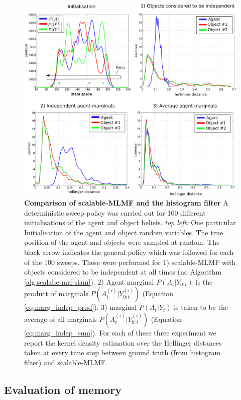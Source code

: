 \begin{figure}
 \includegraphics[width=\textwidth]{./ch5-MLMF/Figures/Figure13.pdf}
 \caption{\textbf{Comparison of scalable-MLMF and the histogram filter} A deterministic sweep policy was carried out for 100 different initialisations of 
 the agent and object beliefs. \textit{top left:} One particular Initialisation of the agent and object
 random variables. The true position of the agent and objects were sampled at random. The black arrow indicates the general policy which was 
 followed for each of the 100 sweeps. 
 These were performed for 1) scalable-MLMF  with objects considered to be independent at all times (no Algorithm \ref{alg:scalabe-mrf-slam}). 2) 
 Agent marginal $P(A_t|Y_{0:t})$ is the product of marginals $P(A^{(i)}_t|Y^{(i)}_{0:t})$ (Equation \ref{eq:marg_indep_prod}). 
 3) marginal $P(A_t|Y_t)$ is taken to be the average 
 of all marginals $P(A^{(i)}_t|Y^{(i)}_{0:t})$ (Equation \ref{eq:marg_indep_sum}).  For each of these three experiment we report the 
 kernel density estimation over the Hellinger distances taken at every time step between ground truth (from histogram filter) and scalable-MLMF.}
 \label{fig:independence_assumption_test}
\end{figure}

\subsection{Evaluation of memory}

